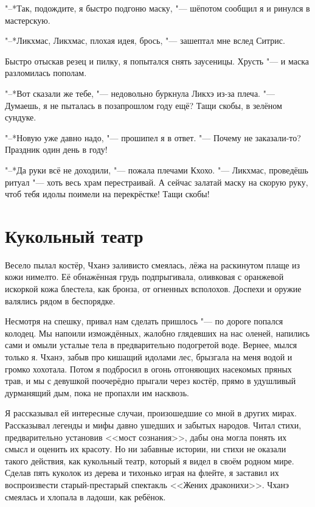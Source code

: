 \documentclass[a4paper,10pt]{book}
\begin{document}
"--*Так, подождите, я быстро подгоню маску, "--- шёпотом сообщил я и ринулся в 
мастерскую.

"--*Ликхмас, Ликхмас, плохая идея, брось, "--- зашептал мне вслед Ситрис.

Быстро отыскав резец и пилку, я попытался снять заусеницы. Хрусть "--- и маска 
разломилась пополам.

"--*Вот сказали же тебе, "--- недовольно буркнула Ликхэ из-за плеча. "--- 
Думаешь, я не пыталась в позапрошлом году ещё? Тащи скобы, в зелёном сундуке.

"--*Новую уже давно надо, "--- прошипел я в ответ. "--- Почему не заказали-то? 
Праздник один день в году!

"--*Да руки всё не доходили, "--- пожала плечами Кхохо. "--- Ликхмас, проведёшь
ритуал "--- хоть весь храм перестраивай. А сейчас залатай маску на скорую руку,
чтоб тебя идолы поимели на перекрёстке! Тащи скобы!

 
 \section{Кукольный театр}

Весело пылал костёр, Чханэ заливисто смеялась, лёжа на раскинутом плаще из кожи 
нимелто. Её обнажённая грудь подпрыгивала, оливковая с оранжевой искоркой кожа 
блестела, как бронза, от огненных всполохов. Доспехи и оружие валялись рядом в 
беспорядке.

Несмотря на спешку, привал нам сделать пришлось "--- по дороге попался колодец. 
Мы напоили измождённых, жалобно глядевших на нас оленей, напились сами и омыли 
усталые тела в предварительно подогретой воде. Вернее, мылся только я. Чханэ, 
забыв про кишащий идолами лес, брызгала на меня водой и громко хохотала.
Потом я подбросил в огонь отгоняющих насекомых пряных трав, и мы с девушкой 
поочерёдно прыгали через костёр, прямо в удушливый дурманящий дым, пока не 
пропахли им насквозь.

Я рассказывал ей интересные случаи, произошедшие со мной в других мирах. 
Рассказывал легенды и мифы давно ушедших и забытых народов. Читал стихи, 
предварительно установив <<мост сознания>>, дабы она могла понять их смысл и 
оценить их красоту. Но ни забавные истории, ни стихи не оказали такого 
действия, как кукольный театр, который я видел в своём родном мире. Сделав пять 
куколок из дерева и тихонько играя на флейте, я заставил их воспроизвести 
старый-престарый спектакль <<Жених драконихи>>. Чханэ смеялась и хлопала в 
ладоши, как ребёнок.
\end{document}
